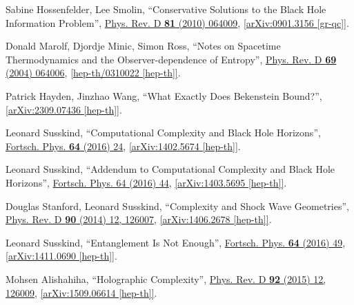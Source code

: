\documentclass[preprintnumbers, floatfix, preprintnumbers, letterpaper, twocolumn, superscriptaddress,nofootinbib]{revtex4-2}
\begin{document}
\begin{thebibliography}{99}
Sabine Hossenfelder, Lee Smolin, ``Conservative Solutions to the Black Hole Information Problem'', {\hypersetup{urlcolor=vividviolet}\href{https://journals.aps.org/prd/abstract/10.1103/PhysRevD.81.064009}{Phys. Rev. D \textbf{81} (2010) 064009}}, \href{https://arxiv.org/abs/0901.3156}{[arXiv:0901.3156 [gr-qc]]}.


Donald Marolf, Djordje Minic, Simon Ross, ``Notes on Spacetime Thermodynamics and the Observer-dependence of Entropy'',  {\hypersetup{urlcolor=vividviolet}\href{https://journals.aps.org/prd/abstract/10.1103/PhysRevD.69.064006}{Phys. Rev. D \textbf{69} (2004) 064006}}, \href{https://arxiv.org/abs/hep-th/0310022}{[hep-th/0310022 [hep-th]]}.

Patrick Hayden, Jinzhao Wang, ``What Exactly Does Bekenstein Bound?'', \href{https://arxiv.org/abs/2309.07436}{[arXiv:2309.07436 [hep-th]]}.

Leonard Susskind, ``Computational Complexity and Black Hole Horizons'',  {\hypersetup{urlcolor=vividviolet}\href{https://onlinelibrary.wiley.com/doi/10.1002/prop.201500092}{Fortsch. Phys. \textbf{64} (2016) 24}},  \href{https://arxiv.org/abs/1402.5674}{[arXiv:1402.5674 [hep-th]]}.

Leonard Susskind, ``Addendum to Computational Complexity and Black Hole Horizons'',  {\hypersetup{urlcolor=vividviolet}\href{https://onlinelibrary.wiley.com/doi/10.1002/prop.201500093}{Fortsch. Phys. 64 (2016) 44}}, \href{https://arxiv.org/abs/1403.5695}{[arXiv:1403.5695 [hep-th]]}.

Douglas Stanford, Leonard Susskind, ``Complexity and Shock Wave Geometries'', {\hypersetup{urlcolor=vividviolet}\href{https://journals.aps.org/prd/abstract/10.1103/PhysRevD.90.126007}{Phys. Rev. D \textbf{90} (2014) 12, 126007}}, \href{https://arxiv.org/abs/1406.2678}{[arXiv:1406.2678 [hep-th]]}.


Leonard Susskind, ``Entanglement Is Not Enough'', {\hypersetup{urlcolor=vividviolet}\href{https://onlinelibrary.wiley.com/doi/10.1002/prop.201500095}{Fortsch. Phys. \textbf{64} (2016) 49}}, \href{https://arxiv.org/abs/1411.0690}{[arXiv:1411.0690 [hep-th]]}.

Mohsen Alishahiha, ``Holographic Complexity'', {\hypersetup{urlcolor=vividviolet}\href{https://journals.aps.org/prd/abstract/10.1103/PhysRevD.92.126009}{Phys. Rev. D \textbf{92} (2015) 12, 126009}}, \href{https://arxiv.org/abs/1509.06614}{[arXiv:1509.06614 [hep-th]]}.


\end{thebibliography}
\end{document}
